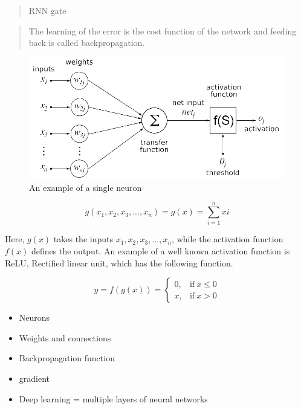 \documentclass[nofilelist]{cslthse-msc}
\begin{document}
\begin{quote}
RNN gate    
\end{quote}



\begin{quote}
    The learning of the error is the cost function of the network and feeding back is called backpropagation.

\end{quote}

\begin{figure}[htp]
    \centering
    \includegraphics[width=12cm]{msccls/explanatory_images/single_neuron.png}
    \caption{An example of a single neuron}
    \label{fig:neuron}
\end{figure}


\begin{equation}
    g(x_1, x_2, x_3,...,x_n) = g(x) = \sum_{i=1}^n  xi
\end{equation}

Here, $g(x)$ takes the inputs $x_1, x_2, x_3,...,x_n$, while the activation function $f(x)$ defines the output. An example of a well known activation function is ReLU, Rectified linear unit, which has the following function. 

\begin{equation}
y = f(g(x)) =
\begin{cases}
  0, & \text{if}\ x \leq 0 \\
  x, & \text{if}\ x > 0
\end{cases}
\end{equation}





\begin{itemize}
    \item Neurons
    \item Weights and connections 
    \item Backpropagation function
    \item gradient
    \item Deep learning = multiple layers of neural networks
\end{itemize}
\end{document}

